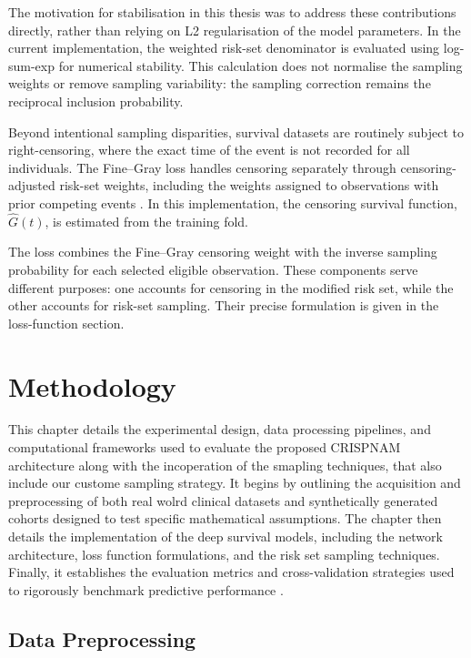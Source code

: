 \documentclass[a4paper,twoside,12pt]{report}
\begin{document}
The motivation for stabilisation in this thesis was to address these contributions directly, rather than relying on L2 regularisation of the model parameters. In the current implementation, the weighted risk-set denominator is evaluated using log-sum-exp for numerical stability. This calculation does not normalise the sampling weights or remove sampling variability: the sampling correction remains the reciprocal inclusion probability.

Beyond intentional sampling disparities, survival datasets are routinely subject to right-censoring, where the exact time of the event is not recorded for all individuals. The Fine--Gray loss handles censoring separately through censoring-adjusted risk-set weights, including the weights assigned to observations with prior competing events \citep{FineGray1999}. In this implementation, the censoring survival function, $\hat G(t)$, is estimated from the training fold.

The loss combines the Fine--Gray censoring weight with the inverse sampling probability for each selected eligible observation. These components serve different purposes: one accounts for censoring in the modified risk set, while the other accounts for risk-set sampling. Their precise formulation is given in the loss-function section.



\chapter{Methodology}
\label{ch:methodology}

This chapter details the experimental design, data processing pipelines, and computational frameworks used to evaluate the proposed CRISPNAM architecture along with the  incoperation of the smapling techniques, that also include our custome sampling strategy. It begins by outlining the acquisition and preprocessing of both real wolrd clinical datasets and synthetically generated cohorts designed to test specific mathematical assumptions. The chapter then details the implementation of the deep survival models, including the network architecture, loss function formulations, and the risk set sampling techniques. Finally, it establishes the evaluation metrics and cross-validation strategies used to rigorously benchmark predictive performance .

\section{Data Preprocessing}
\end{document}
